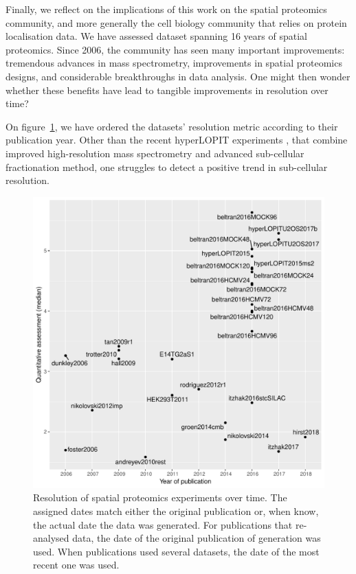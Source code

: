 \documentclass[12pt]{article}\usepackage[]{graphicx}\usepackage[]{color}
\newenvironment{knitrout}{}{} %
\begin{document}
\bigskip

Finally, we reflect on the implications of this work on the spatial
proteomics community, and more generally the cell biology community
that relies on protein localisation data. We have assessed dataset
spanning 16 years of spatial proteomics. Since 2006, the community has
seen many important improvements: tremendous advances in mass
spectrometry, improvements in spatial proteomics designs, and
considerable breakthroughs in data analysis. One might then wonder
whether these benefits have lead to tangible improvements in
resolution over time?

On figure~\ref{fig:restime}, we have ordered the datasets' resolution
metric according to their publication year. Other than the recent
hyperLOPIT experiments \citet{Christoforou:2016}, that combine
improved high-resolution mass spectrometry and advanced sub-cellular
fractionation method, one struggles to detect a positive trend in
sub-cellular resolution.

\begin{figure}[h]
  \centering
\begin{knitrout}
\color{fgcolor}
\includegraphics[width=0.8\linewidth]{figure/restime-1} 

\end{knitrout}
\caption{Resolution of spatial proteomics experiments over time. The
  assigned dates match either the original publication or, when know,
  the actual date the data was generated. For publications that
  re-analysed data, the date of the original publication of generation
  was used. When publications used several datasets, the date of the
  most recent one was used.}
  \label{fig:restime}
\end{figure}
\end{document}
